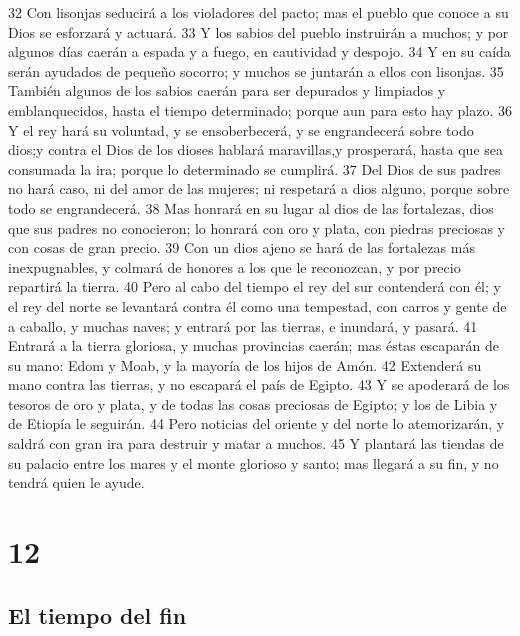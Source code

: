 32 Con lisonjas seducirá a los violadores del pacto; mas el pueblo que conoce a su Dios se esforzará y actuará.
33 Y los sabios del pueblo instruirán a muchos; y por algunos días caerán a espada y a fuego, en cautividad y despojo.
34 Y en su caída serán ayudados de pequeño socorro; y muchos se juntarán a ellos con lisonjas.
35 También algunos de los sabios caerán para ser depurados y limpiados y emblanquecidos, hasta el tiempo determinado; porque aun para esto hay plazo.
36 Y el rey hará su voluntad, y se ensoberbecerá, y se engrandecerá sobre todo dios;y contra el Dios de los dioses hablará maravillas,y prosperará, hasta que sea consumada la ira; porque lo determinado se cumplirá.
37 Del Dios de sus padres no hará caso, ni del amor de las mujeres; ni respetará a dios alguno, porque sobre todo se engrandecerá.
38 Mas honrará en su lugar al dios de las fortalezas, dios que sus padres no conocieron; lo honrará con oro y plata, con piedras preciosas y con cosas de gran precio.
39 Con un dios ajeno se hará de las fortalezas más inexpugnables, y colmará de honores a los que le reconozcan, y por precio repartirá la tierra.
40 Pero al cabo del tiempo el rey del sur contenderá con él; y el rey del norte se levantará contra él como una tempestad, con carros y gente de a caballo, y muchas naves; y entrará por las tierras, e inundará, y pasará.
41 Entrará a la tierra gloriosa, y muchas provincias caerán; mas éstas escaparán de su mano: Edom y Moab, y la mayoría de los hijos de Amón.
42 Extenderá su mano contra las tierras, y no escapará el país de Egipto.
43 Y se apoderará de los tesoros de oro y plata, y de todas las cosas preciosas de Egipto; y los de Libia y de Etiopía le seguirán.
44 Pero noticias del oriente y del norte lo atemorizarán, y saldrá con gran ira para destruir y matar a muchos. 
45 Y plantará las tiendas de su palacio entre los mares y el monte glorioso y santo; mas llegará a su fin, y no tendrá quien le ayude.

\chapter{12}

\section*{El tiempo del fin}

